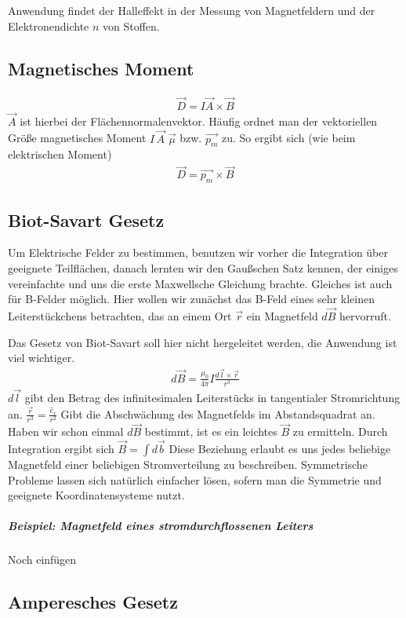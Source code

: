 Anwendung findet der Halleffekt in der Messung von Magnetfeldern und der Elektronendichte $n$ von Stoffen.

\subsection{Magnetisches Moment}
\begin{align} \label{eqn:Magnetisches Moment1}
\vec{D} = I \vec{A} \times \vec{B}
\end{align} $\vec{A}$ ist hierbei der Flächennormalenvektor. Häufig ordnet man der vektoriellen Größe magnetisches Moment $I \,\vec{A}$  $\vec{\mu}$ bzw. $\vec{p_m}$ zu. So ergibt sich (wie beim elektrischen Moment)
\begin{align} \label{eqn:Magnetisches Moment}
\boxed{\vec{D} = \vec{p_m} \times \vec{B}}
\end{align}

\subsection{Biot-Savart Gesetz}
Um Elektrische Felder zu bestimmen, benutzen wir vorher die Integration über geeignete Teilflächen, danach lernten wir den Gaußschen Satz kennen, der einiges vereinfachte und uns die erste Maxwellsche Gleichung brachte.
Gleiches ist auch für B-Felder möglich. Hier wollen wir zunächst das B-Feld eines sehr kleinen Leiterstückchens betrachten, das an einem Ort $\vec{r}$ ein Magnetfeld $d\vec{B}$ hervorruft. 

Das Gesetz von Biot-Savart soll hier nicht hergeleitet werden, die Anwendung ist viel wichtiger.
\begin{align} \label{eqn:Biot-Savart}
\boxed{d\vec{B} = \frac{\mu_0}{4\pi} I \frac{d\vec{l} \times \vec{r}}{r^3}}
\end{align}$d\vec{l}$ gibt den Betrag des infinitesimalen Leiterstücks in tangentialer Stromrichtung an. $\frac{\vec{r}}{r^3} = \frac{\hat{e}_r}{r^2}$ Gibt die Abschwächung des Magnetfelds im Abstandsquadrat an.   Haben wir schon einmal $d\vec{B}$ bestimmt, ist es ein leichtes $\vec{B}$ zu 
ermitteln.
Durch Integration ergibt sich $\vec{B} = \int d\vec{b}$ 
Diese Beziehung erlaubt es uns jedes beliebige Magnetfeld einer beliebigen Stromverteilung zu beschreiben. Symmetrische Probleme lassen sich natürlich einfacher lösen, sofern man die Symmetrie und geeignete Koordinatensysteme nutzt.
\subparagraph{Beispiel: Magnetfeld eines stromdurchflossenen Leiters}
Noch einfügen

\subsection{Amperesches Gesetz}
